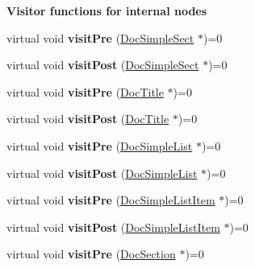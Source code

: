 \begin{Indent}{\bf Visitor functions for internal nodes}
\begin{DoxyCompactItemize}
\item 
\hypertarget{class_doc_visitor_a58b184a72a5e49352bcd7248304b683f}{virtual void {\bfseries visit\-Pre} (\hyperlink{class_doc_simple_sect}{Doc\-Simple\-Sect} $\ast$)=0}\label{class_doc_visitor_a58b184a72a5e49352bcd7248304b683f}

\item 
\hypertarget{class_doc_visitor_a9c8d36b36cc4ef1b265c7a003e39abfe}{virtual void {\bfseries visit\-Post} (\hyperlink{class_doc_simple_sect}{Doc\-Simple\-Sect} $\ast$)=0}\label{class_doc_visitor_a9c8d36b36cc4ef1b265c7a003e39abfe}

\item 
\hypertarget{class_doc_visitor_a800e36caad1e3ab276522b3dc1d228f5}{virtual void {\bfseries visit\-Pre} (\hyperlink{class_doc_title}{Doc\-Title} $\ast$)=0}\label{class_doc_visitor_a800e36caad1e3ab276522b3dc1d228f5}

\item 
\hypertarget{class_doc_visitor_adbbadfebc2cf15c119376b1b53cc1dd0}{virtual void {\bfseries visit\-Post} (\hyperlink{class_doc_title}{Doc\-Title} $\ast$)=0}\label{class_doc_visitor_adbbadfebc2cf15c119376b1b53cc1dd0}

\item 
\hypertarget{class_doc_visitor_af27f49b3426e2d199df6fef23a545239}{virtual void {\bfseries visit\-Pre} (\hyperlink{class_doc_simple_list}{Doc\-Simple\-List} $\ast$)=0}\label{class_doc_visitor_af27f49b3426e2d199df6fef23a545239}

\item 
\hypertarget{class_doc_visitor_a3487914d2ac2f72f7209bce8ae6bb205}{virtual void {\bfseries visit\-Post} (\hyperlink{class_doc_simple_list}{Doc\-Simple\-List} $\ast$)=0}\label{class_doc_visitor_a3487914d2ac2f72f7209bce8ae6bb205}

\item 
\hypertarget{class_doc_visitor_aea8263c97927e14cfe090b9d3826be6a}{virtual void {\bfseries visit\-Pre} (\hyperlink{class_doc_simple_list_item}{Doc\-Simple\-List\-Item} $\ast$)=0}\label{class_doc_visitor_aea8263c97927e14cfe090b9d3826be6a}

\item 
\hypertarget{class_doc_visitor_a8a2f8a8e4e12fda3f4cb50284e4a1c1d}{virtual void {\bfseries visit\-Post} (\hyperlink{class_doc_simple_list_item}{Doc\-Simple\-List\-Item} $\ast$)=0}\label{class_doc_visitor_a8a2f8a8e4e12fda3f4cb50284e4a1c1d}

\item 
\hypertarget{class_doc_visitor_a8169b04d99b5af4ee7ce4b47309640fb}{virtual void {\bfseries visit\-Pre} (\hyperlink{class_doc_section}{Doc\-Section} $\ast$)=0}\label{class_doc_visitor_a8169b04d99b5af4ee7ce4b47309640fb}


\end{DoxyCompactItemize}
\end{Indent}
